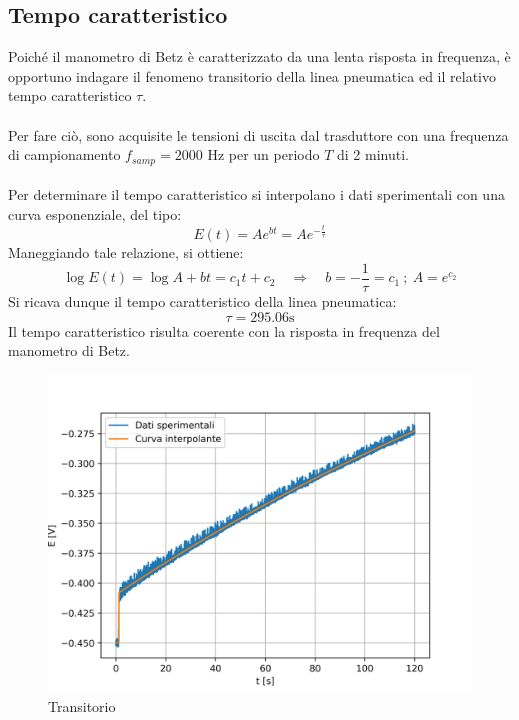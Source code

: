 \newpage
\subsection{Tempo caratteristico}
Poiché il manometro di Betz è caratterizzato da una lenta risposta in frequenza, è opportuno indagare il fenomeno transitorio della linea pneumatica ed il relativo tempo caratteristico $\tau$.\\\\
Per fare ciò, sono acquisite le tensioni di uscita dal trasduttore con una frequenza di campionamento $f_{samp}=2000$ Hz per un periodo $T$ di 2 minuti.\\\\
Per determinare il tempo caratteristico si interpolano i dati sperimentali con una curva esponenziale, del tipo:
\begin{equation*}
    E(t) = Ae^{bt} = Ae^{-\frac t\tau}
\end{equation*}
Maneggiando tale relazione, si ottiene:
\begin{equation*}
    \log E(t) = \log A + bt = c_1 t + c_2 \quad \Rightarrow \quad b = -\frac1\tau = c_1 \ ; \ A = e^{c_2}
\end{equation*}
Si ricava dunque il tempo caratteristico della linea pneumatica:
\begin{equation*}
    \tau = 295.06 \text{s}
\end{equation*}
Il tempo caratteristico risulta coerente con la risposta in frequenza del manometro di Betz.
\begin{figure}[h!]
    \centering
    \includegraphics[width=.8\textwidth]{images/1/transitorio.png}
    \caption{Transitorio}\label{fig:t1}
\end{figure}